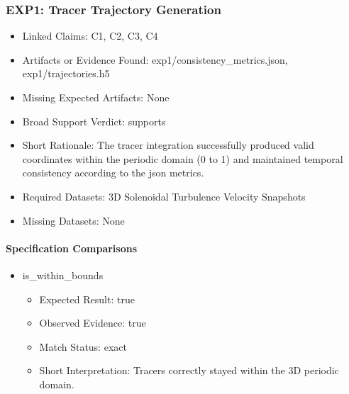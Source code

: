 \documentclass[11pt]{article}
\begin{document}
\subsubsection*{EXP1: Tracer Trajectory Generation}

\begin{itemize}

\item Linked Claims: C1, C2, C3, C4

\item Artifacts or Evidence Found: exp1/consistency\_metrics.json, exp1/trajectories.h5

\item Missing Expected Artifacts: None

\item Broad Support Verdict: supports

\item Short Rationale: The tracer integration successfully produced valid coordinates within the periodic domain (0 to 1) and maintained temporal consistency according to the json metrics.

\item Required Datasets: 3D Solenoidal Turbulence Velocity Snapshots

\item Missing Datasets: None

\end{itemize}

\paragraph{Specification Comparisons}

\begin{itemize}

\item is\_within\_bounds

\begin{itemize}

\item Expected Result: true

\item Observed Evidence: true

\item Match Status: exact

\item Short Interpretation: Tracers correctly stayed within the 3D periodic domain.

\end{itemize}

\end{itemize}
\end{document}
